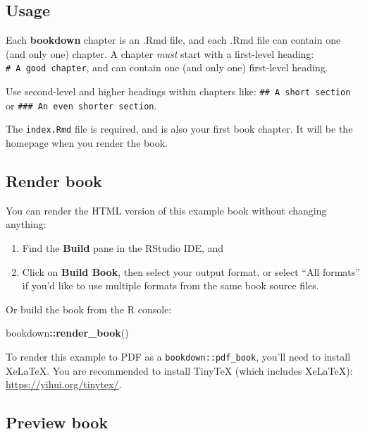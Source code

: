 \documentclass[
]{book}
\newenvironment{Shaded}{\begin{snugshade}}{\end{snugshade}}
\newcommand{\FunctionTok}[1]{\textcolor[rgb]{0.13,0.29,0.53}{\textbf{#1}}}
\newcommand{\NormalTok}[1]{#1}
\newcommand{\SpecialCharTok}[1]{\textcolor[rgb]{0.81,0.36,0.00}{\textbf{#1}}}
\theoremstyle{definition}
\theoremstyle{definition}
\theoremstyle{definition}
\theoremstyle{definition}
\theoremstyle{remark}
\begin{document}
\subsection{Usage}\label{usage}

Each \textbf{bookdown} chapter is an .Rmd file, and each .Rmd file can contain one (and only one) chapter. A chapter \emph{must} start with a first-level heading: \texttt{\#\ A\ good\ chapter}, and can contain one (and only one) first-level heading.

Use second-level and higher headings within chapters like: \texttt{\#\#\ A\ short\ section} or \texttt{\#\#\#\ An\ even\ shorter\ section}.

The \texttt{index.Rmd} file is required, and is also your first book chapter. It will be the homepage when you render the book.

\subsection{Render book}\label{render-book}

You can render the HTML version of this example book without changing anything:

\begin{enumerate}
\def\labelenumi{\arabic{enumi}.}
\item
  Find the \textbf{Build} pane in the RStudio IDE, and
\item
  Click on \textbf{Build Book}, then select your output format, or select ``All formats'' if you'd like to use multiple formats from the same book source files.
\end{enumerate}

Or build the book from the R console:

\begin{Shaded}
\begin{Highlighting}[]
\NormalTok{bookdown}\SpecialCharTok{::}\FunctionTok{render\_book}\NormalTok{()}
\end{Highlighting}
\end{Shaded}

To render this example to PDF as a \texttt{bookdown::pdf\_book}, you'll need to install XeLaTeX. You are recommended to install TinyTeX (which includes XeLaTeX): \url{https://yihui.org/tinytex/}.

\subsection{Preview book}\label{preview-book}
\end{document}
